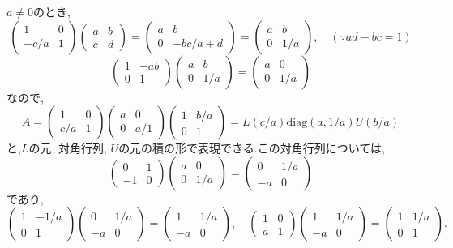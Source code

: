 $a\neq 0$のとき,
\[  
\begin{pmatrix}1&0\\-c/a&1\end{pmatrix}\begin{pmatrix}a&b\\c&d\end{pmatrix}
=\begin{pmatrix}a&b\\0&-bc/a+d\end{pmatrix}
=\begin{pmatrix}a&b\\0&1/a\end{pmatrix},\quad (\because ad-bc=1)
\]
\[
\begin{pmatrix}1&-ab\\0&1\end{pmatrix}\begin{pmatrix}a&b\\0&1/a\end{pmatrix}
=\begin{pmatrix}a&0\\0&1/a\end{pmatrix}
\]
なので,
\[
A=\begin{pmatrix}1&0\\c/a&1\end{pmatrix}
\begin{pmatrix}a&0\\0&a/1\end{pmatrix}\begin{pmatrix}1&b/a\\0&1\end{pmatrix}
=L(c/a)\mathrm{diag}(a,1/a)U(b/a)
\]
と,$L$の元, 対角行列, $U$の元の積の形で表現できる.この対角行列については,
\[
\begin{pmatrix}0&1\\-1&0\end{pmatrix}\begin{pmatrix}a&0\\0&1/a\end{pmatrix}
=\begin{pmatrix}0&1/a\\-a&0\end{pmatrix}
\]
であり,
\[
\begin{pmatrix}1&-1/a\\0&1\end{pmatrix}\begin{pmatrix}0&1/a\\-a&0\end{pmatrix}
=\begin{pmatrix}1&1/a\\-a&0\end{pmatrix},\quad
\begin{pmatrix}1&0\\a&1\end{pmatrix}\begin{pmatrix}1&1/a\\-a&0\end{pmatrix}
=\begin{pmatrix}1&1/a\\0&1\end{pmatrix}.
\]

